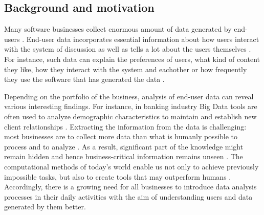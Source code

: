\subsection{Background and motivation}
    Many software businesses collect enormous amount of data generated by end-users \cite{chinesemobilebankingusers, bigdatamanagementrevolution, inmon2007tapping}. End-user data incorporates essential information about how users interact with the system of discussion as well as tells a lot about the users themselves \cite{jang2015noreciprocity, hu2014we, jang2016teensengagemorewithfewerphotos, han2016teensarefrommars, socialdiversityongithub}. For instance, such data can explain the preferences of users, what kind of content they like, how they interact with the system and eachother or how frequently they use the software that has generated the data \cite{youyou2015computer, ottoni2013ladies}.
    
    Depending on the portfolio of the business, analysis of end-user data can reveal various interesting findings. For instance, in banking industry Big Data tools are often used to analyze demographic characteristics to maintain and establish new client relationships \cite{chinesemobilebankingusers, bigdatamanagementrevolution}. Extracting the information from the data is challenging: most businesses are to collect more data than what is humanly possible to process and to analyze \cite{inmon2007tapping, wegener2010integrating}. As a result, significant part of the knowledge might remain hidden and hence business-critical information remains unseen \cite{inmon2007tapping, wegener2010integrating, introtodatamining, chinesemobilebankingusers}. The computational methods of today's world enable us not only to achieve previously impossible tasks, but also to create tools that may outperform humans \cite{youyou2015computer}. Accordingly, there is a growing need for all businesses to introduce data analysis processes in their daily activities with the aim of understanding users and data generated by them better.
    
